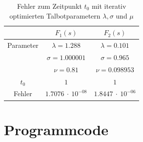 \begin{table}
\centering
\begin{tabular}[c]{c|c|c}
& $F_{1}(s)$ & $F_{2}(s)$ \\
\hline
Parameter & $\lambda=1.288$ & $\lambda=0.101$ \\
 & $\sigma=1.000001$ & $\sigma=0.965$ \\
 & $\nu=0.81$ & $\nu=0.098953$ \\
\hline
$t_{0}$ & $1$ & $1$ \\
\hline
Fehler & $1.7076~\cdot~10^{-08}$ & $1.8447~\cdot~10^{-06}$ \\
\end{tabular}
\caption{Fehler zum Zeitpunkt $t_{0}$ mit iterativ optimierten Talbotparametern $\lambda, \sigma$ und $\mu$
\label{laplace:parametertabelle2}}
\end{table}


%
%
%
%
%
%

\FloatBarrier
\section{Programmcode\label{laplace:section:programmcode}}


